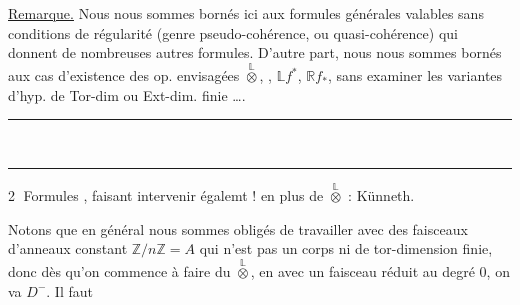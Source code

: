 \uline{Remarque.} Nous nous sommes bornés ici aux formules générales valables sans conditions de régularité (genre pseudo-cohérence, ou quasi-cohérence) qui donnent de nombreuses autres formules. D'autre part, nous nous sommes bornés aux cas d'existence  des op. envisagées $\overset{\mathbb L}{\otimes}$, , $\mathbb L f^*$, $\mathbb R f_*$, sans examiner les variantes  d'hyp. de Tor-dim ou Ext-dim. finie \ldots.

\begin{center}\rule{0.95cm}{0.4pt}\\[-0.75em]\rule{0.72cm}{0.4pt}\end{center}

\textcircled{2} Formules , faisant intervenir égalemt $!$ en plus de $\overset{\mathbb L}{\otimes}$ : Künneth.


Notons que en général nous sommes obligés de travailler avec des faisceaux d'anneaux constant $\mathbb Z/n\mathbb Z=A$ qui n'est pas un corps ni de tor-dimension  finie, donc dès qu'on commence à faire du $\overset{\mathbb L}{\otimes}$,  en  avec un faisceau réduit au degré 0, on va   $D^-$. Il faut
